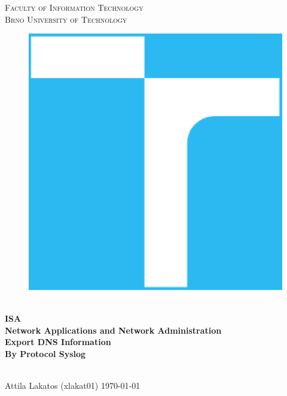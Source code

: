 \documentclass[11pt,a4paper]{article}
\begin{document}


\begin{titlepage}
    \begin{center}
        \Huge
        \textsc{
            Faculty of Information Technology\\
            Brno University of Technology
        }
        \vspace{80px}
        \begin{figure}[!h]
            \centering
            \includegraphics[scale=0.3]{img/vutbr-fit-logo.eps}
        \end{figure}
        \\[15mm]
        \Huge{
            \textbf{
                ISA
            }
        }
        \\[1.5mm]
        \huge{
            \textbf{
                Network Applications and Network Administration
            }
        }
        \\[2.5em]
        \LARGE{
            \textbf{
                Export DNS Information\\
                By Protocol Syslog
            }
        }
        \vfill
    \end{center}
        \Large{
            \hfill\\
            Attila Lakatos (xlakat01) \hfill \today
        }

\end{titlepage}
\end{document}
